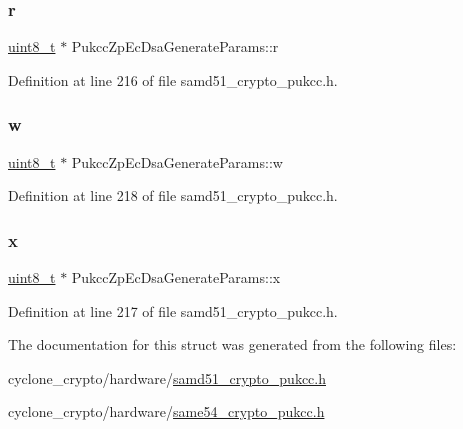 \subsubsection{\texorpdfstring{r}{r}}
{\footnotesize\ttfamily \hyperlink{stdint_8h_aba7bc1797add20fe3efdf37ced1182c5}{uint8\+\_\+t} $\ast$ Pukcc\+Zp\+Ec\+Dsa\+Generate\+Params\+::r}



Definition at line 216 of file samd51\+\_\+crypto\+\_\+pukcc.\+h.

\mbox{\label{structPukccZpEcDsaGenerateParams_a2f5e57865fea17a2400913715241e356}} 
\subsubsection{\texorpdfstring{w}{w}}
{\footnotesize\ttfamily \hyperlink{stdint_8h_aba7bc1797add20fe3efdf37ced1182c5}{uint8\+\_\+t} $\ast$ Pukcc\+Zp\+Ec\+Dsa\+Generate\+Params\+::w}



Definition at line 218 of file samd51\+\_\+crypto\+\_\+pukcc.\+h.

\mbox{\label{structPukccZpEcDsaGenerateParams_ad1e4d535ebd29d5d2282116af706e268}} 
\subsubsection{\texorpdfstring{x}{x}}
{\footnotesize\ttfamily \hyperlink{stdint_8h_aba7bc1797add20fe3efdf37ced1182c5}{uint8\+\_\+t} $\ast$ Pukcc\+Zp\+Ec\+Dsa\+Generate\+Params\+::x}



Definition at line 217 of file samd51\+\_\+crypto\+\_\+pukcc.\+h.



The documentation for this struct was generated from the following files\+:\begin{DoxyCompactItemize}
\item 
cyclone\+\_\+crypto/hardware/\hyperlink{samd51__crypto__pukcc_8h}{samd51\+\_\+crypto\+\_\+pukcc.\+h}\item 
cyclone\+\_\+crypto/hardware/\hyperlink{same54__crypto__pukcc_8h}{same54\+\_\+crypto\+\_\+pukcc.\+h}\end{DoxyCompactItemize}
